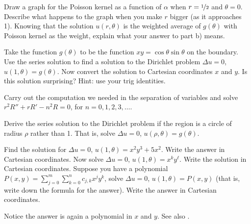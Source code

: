 \begin{exercise}
\leavevmode
\begin{tasks}
\task Draw a graph for the Poisson kernel as a function of $\alpha$
when $r=\nicefrac{1}{2}$ and $\theta = 0$.
\task Describe what happens to the graph when you make $r$ bigger (as it
approaches 1).
\task Knowing that the solution $u(r,\theta)$ is the weighted average
of $g(\theta)$ with Poisson kernel as the weight, explain what your answer
to part b) means.
\end{tasks}
\end{exercise}

\begin{exercise} \label{exercise:dirichproblemxy}
Take the function $g(\theta)$ to be the function $xy = \cos \theta \sin
\theta$ on the boundary.  Use the series solution to find a solution
to the Dirichlet problem $\Delta u = 0$, $u(1,\theta) = g(\theta)$.  Now
convert the solution to Cartesian coordinates $x$ and $y$.  Is this
solution surprising?  Hint: use your trig identities.
\end{exercise}

\begin{exercise}
Carry out the computation we needed in the separation of variables and solve
$r^2 R'' + r R' - n^2 R = 0$, for $n=0,1,2,3,\ldots$.
\end{exercise}

\begin{exercise}[challenging]
Derive the series solution to the Dirichlet problem if the region is a
circle of radius $\rho$ rather
than 1.
That is, solve $\Delta u = 0$, $u(\rho,\theta) = g(\theta)$.
\end{exercise}

\begin{exercise}[challenging]
\leavevmode
\begin{tasks}
\task
Find the solution for
$\Delta u = 0$, $u(1,\theta) = x^2y^3 + 5 x^2$.  Write the answer in Cartesian coordinates.
\task
Now solve
$\Delta u = 0$, $u(1,\theta) = x^k y^\ell$.
Write the solution in Cartesian coordinates.
\task
Suppose you have a polynomial $P(x,y) = \sum_{j=0}^m \sum_{k=0}^n c_{j,k}
x^j y^k$, solve $\Delta u = 0$, $u(1,\theta) = P(x,y)$ (that is, write down
the formula for the answer).  Write the answer
in Cartesian coordinates.
\end{tasks}
Notice the answer is again a polynomial in $x$ and $y$.
See also .
\end{exercise}

